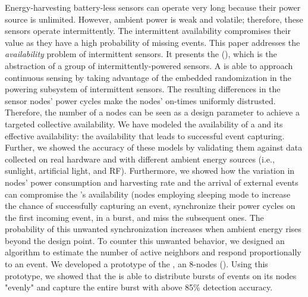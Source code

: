 Energy-harvesting battery-less sensors can operate very long because their power source is unlimited. 
However, ambient power is weak and volatile; therefore, these sensors operate intermittently.
The intermittent availability compromises their value as they have a high probability of missing events. 
This paper addresses the \emph{availability} problem of intermittent sensors. 
%
It presents the \textit{\fullcis} (\cis), which is the abstraction of a group of intermittently-powered sensors.
A \cis is able to approach continuous sensing by taking advantage of the embedded randomization in the powering subsystem of intermittent sensors.
The resulting differences in the sensor nodes' power cycles make the nodes' on-times uniformly distrusted. 
Therefore, the number of a \cis nodes can be seen as a design parameter to achieve a targeted collective availability. 
We have modeled the availability of a \cis and its effective availability: the availability that leads to successful event capturing. 
Further, we showed the accuracy of these models by validating them against data collected on real hardware and with different ambient energy sources (i.e., sunlight, artificial light, and RF). 
%
Furthermore, we showed how the variation in nodes' power consumption and harvesting rate and the arrival of external events can compromise the \cis's availability (nodes employing sleeping mode to increase the chance of successfully capturing an event, synchronize their power cycles on the first incoming event, in a burst, and miss the subsequent ones. The probability of this unwanted synchronization increases when ambient energy rises beyond the design point.  
% 
To counter this unwanted behavior, we designed an algorithm to estimate the number of active neighbors and respond proportionally to an event. 
We developed a prototype of the \cis, an 8-nodes \fullCIM (\cim). 
Using this prototype, we showed that the \fullcis is able to distribute bursts of events on its nodes "evenly" and capture the entire burst with above 85\% detection accuracy.
 

